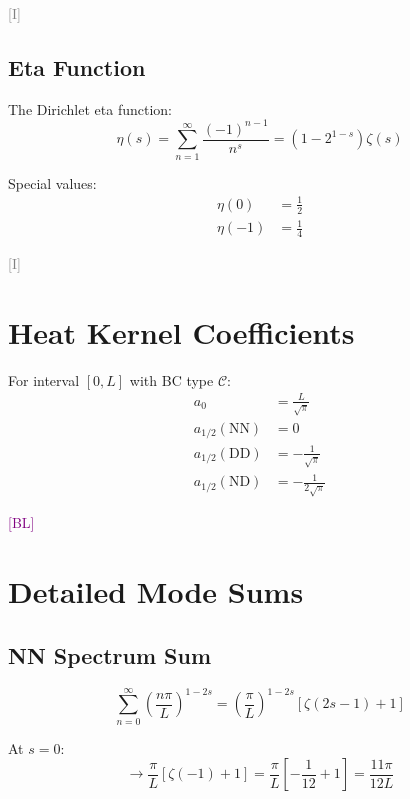 \documentclass[11pt,a4paper]{article}
\newcommand{\tagI}{\textcolor{gray}{[I]}}
\newcommand{\tagBL}{\textcolor{purple}{[BL]}}
\begin{document}
\tagI

\subsection{Eta Function}

The Dirichlet eta function:
\begin{equation}
\label{eq:app-eta-def}
\eta(s) = \sum_{n=1}^\infty \frac{(-1)^{n-1}}{n^s} = (1 - 2^{1-s}) \zeta(s)
\end{equation}

Special values:
\begin{align}
\label{eq:app-eta-0}
\eta(0) &= \frac{1}{2} \\
\label{eq:app-eta-m1}
\eta(-1) &= \frac{1}{4}
\end{align}

\tagI

\section{Heat Kernel Coefficients}
\label{app:heat}

For interval $[0, L]$ with BC type $\mathcal{C}$:
\begin{align}
\label{eq:app-a0}
a_0 &= \frac{L}{\sqrt{\pi}} \\
\label{eq:app-a12-NN}
a_{1/2}(\text{NN}) &= 0 \\
\label{eq:app-a12-DD}
a_{1/2}(\text{DD}) &= -\frac{1}{\sqrt{\pi}} \\
\label{eq:app-a12-ND}
a_{1/2}(\text{ND}) &= -\frac{1}{2\sqrt{\pi}}
\end{align}

\tagBL

\section{Detailed Mode Sums}
\label{app:sums}

\subsection{NN Spectrum Sum}

\begin{equation}
\label{eq:app-NN-sum}
\sum_{n=0}^\infty \left(\frac{n\pi}{L}\right)^{1-2s} = \left(\frac{\pi}{L}\right)^{1-2s}
\left[\zeta(2s-1) + 1\right]
\end{equation}

At $s = 0$:
\begin{equation}
\label{eq:app-NN-s0}
\to \frac{\pi}{L} \left[\zeta(-1) + 1\right] = \frac{\pi}{L} \left[-\frac{1}{12} + 1\right]
= \frac{11\pi}{12L}
\end{equation}
\end{document}
